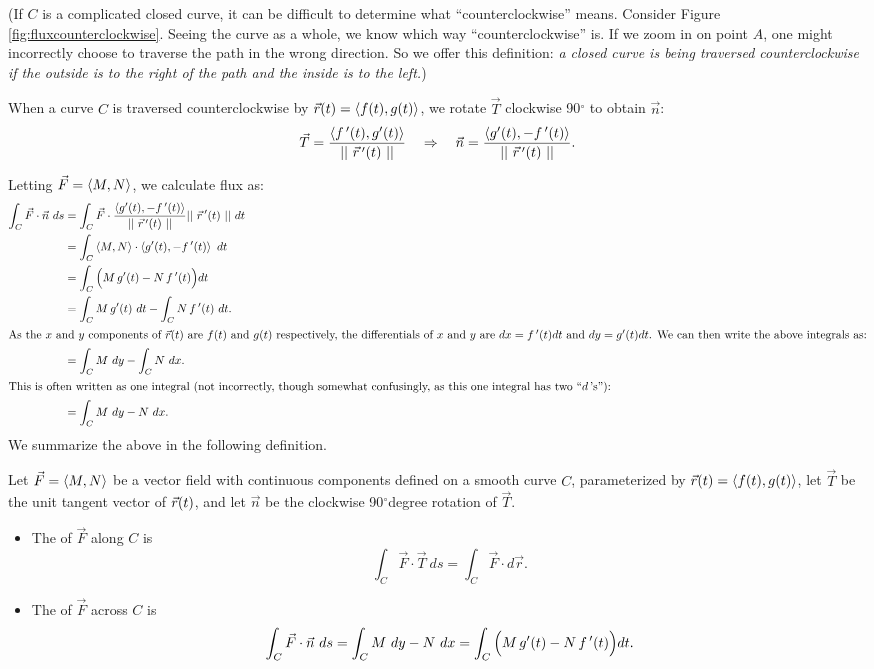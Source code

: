 (If $C$ is a complicated closed curve, it can be difficult to determine what ``counterclockwise'' means. Consider Figure \ref{fig:fluxcounterclockwise}. Seeing the curve as a whole, we know which way ``counterclockwise'' is. If we zoom in on point $A$, one might incorrectly choose to traverse the path in the wrong direction. So we offer this definition: \textit{a closed curve is being traversed counterclockwise if the outside is to the right of the path and the inside is to the left.})

When a curve $C$ is traversed counterclockwise by $\vec r(t) = \left\langle f(t), g(t)\right\rangle$, we rotate $\vec T$ clockwise 90$^\circ$  to obtain $\vec n$:
$$\vec T = \frac{\left\langle f\,'(t),g'(t)\right\rangle}{||\ \vec r\, '(t)\ ||} \quad \Rightarrow \quad \vec n = \frac{\left\langle g'(t),-f\,'(t)\right\rangle}{||\ \vec r\, '(t)\ ||}.$$

Letting $\vec F = \left\langle M, N\right\rangle$, we calculate flux as:
\begin{align*}
\int_C \vec F\cdot \vec n\ ds &= \int_C \vec F\cdot \frac{\left\langle g'(t),-f\,'(t)\right\rangle}{||\ \vec r\, '(t)\ ||} ||\ \vec r\, '(t)\ ||\ dt \\
				&= \int_C \left\langle M, N\right\rangle \cdot \left\langle g'(t),-f\,'(t)\right\rangle\ dt \\
				&= \int_C \Big(M\,g'(t) - N\,f\,'(t)\Big)dt\\
				&= \int_C M\,g'(t)\ dt - \int_C N\,f\,'(t)\ dt.\\
				\intertext{As the $x$ and $y$ components of $\vec r(t)$ are $f(t)$ and $g(t)$ respectively, the differentials of $x$ and $y$ are $dx = f\,'(t)dt$ and $dy=g'(t)dt$. We can then write the above integrals as:}
				&= \int_C M\ dy - \int_C N\ dx.\\
				\intertext{This is often written as one integral (not incorrectly, though somewhat confusingly, as this one integral has two ``$d$\,'s''):}
				&=\int_CM\ dy -N\ dx.
\end{align*}
We summarize the above in the following definition.

{Let $\vec F=\left\langle M,N\right\rangle$ be a vector field with continuous components defined on a smooth curve $C$, parameterized by $\vec r(t) =\left\langle f(t),g(t)\right\rangle$, let $\vec T$ be the unit tangent vector of $\vec r(t)$, and let $\vec n$ be the clockwise 90$^\circ$degree rotation of $\vec T$.
\begin{itemize}
	\item The  of $\vec F$ along $C$ is
$$\int_C \vec F\cdot\vec T\ ds=\int_C \vec F\cdot d\vec r.$$
	\item The  of $\vec F$ across $C$ is
$$\int_C \vec F\cdot \vec n\ ds =  \int_C M\ dy -N\ dx = \int_C\Big(M\,g'(t) - N\,f\,'(t)\Big)dt. $$
\end{itemize}
}

